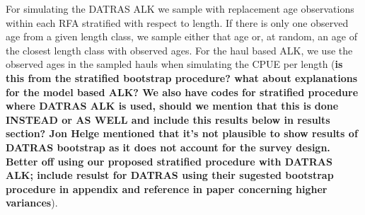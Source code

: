 \documentclass[a4paper 12pt]{article}
\numberwithin{equation}{section}
\begin{document}
For simulating the DATRAS ALK we sample with replacement age observations within each RFA stratified with respect to length. If there is only one observed age from a given length class, we sample either that age or, at random, an age of the closest length class with observed ages. For the haul based ALK, we use the observed ages in the sampled hauls when simulating the CPUE per length ({\bf is this from the stratified bootstrap procedure? what about explanations for the model based ALK? We also have codes for stratified procedure where DATRAS ALK is used, should we mention that this is done INSTEAD or AS WELL and include this results below in results section? Jon Helge mentioned that it's not plausible to show results of DATRAS bootstrap as it does not account for the survey design. Better off using our proposed stratified procedure with DATRAS ALK; include resulst for DATRAS using their sugested bootstrap procedure in appendix and reference in paper concerning higher variances}).
\end{document}
